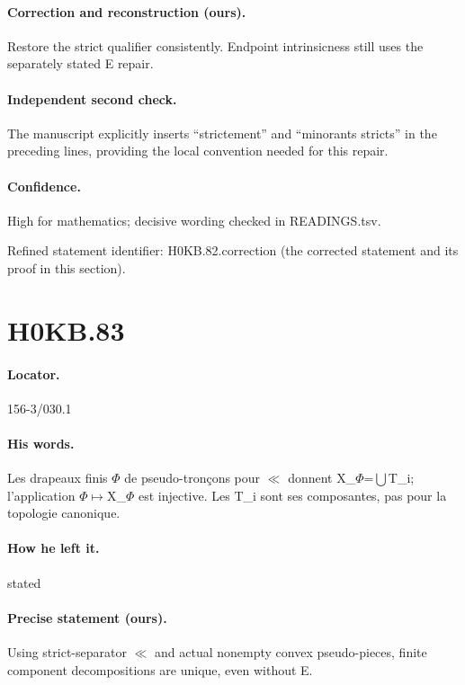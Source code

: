 \paragraph{Correction and reconstruction (ours).} Restore the strict qualifier consistently. Endpoint intrinsicness still uses the separately stated E repair.

\paragraph{Independent second check.} The manuscript explicitly inserts “strictement” and “minorants stricts” in the preceding lines, providing the local convention needed for this repair.

\paragraph{Confidence.} High for mathematics; decisive wording checked in READINGS.tsv.

\noindent Refined statement identifier: H0KB.82.correction (the corrected statement and its proof in this section).

\section*{H0KB.83}\label{statement:H0KB.83}
\paragraph{Locator.} 156-3/030.1

\paragraph{His words.} Les drapeaux finis \ensuremath{\Phi} de pseudo-tronçons pour \ensuremath{\ll} donnent X\_\ensuremath{\Phi}=\ensuremath{\bigcup}T\_i; l’application \ensuremath{\Phi}\ensuremath{\mapsto}X\_\ensuremath{\Phi} est injective. Les T\_i sont ses composantes, pas pour la topologie canonique.

\paragraph{How he left it.} stated

\paragraph{Precise statement (ours).} Using strict-separator \ensuremath{\ll} and actual nonempty convex pseudo-pieces, finite component decompositions are unique, even without E.

